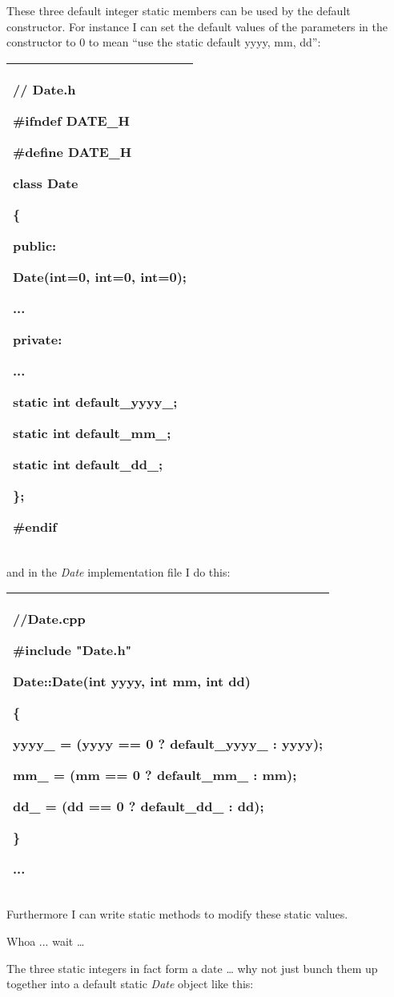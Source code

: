 \documentclass[
]{article}
\begin{document}
These three default integer static members can be used by the default
constructor. For instance I can set the default values of the parameters
in the constructor to 0 to mean ``use the static default yyyy, mm, dd'':

\begin{longtable}[]{@{}l@{}}
\toprule
\endhead
\begin{minipage}[t]{0.97\columnwidth}\raggedright
// Date.h

\#ifndef DATE\_H

\#define DATE\_H

class Date

\{

public:

Date(int=\textbf{0}, int=\textbf{0}, int=\textbf{0});

...

private:

...

static int default\_yyyy\_;

static int default\_mm\_;

static int default\_dd\_;

\};

\#endif\strut
\end{minipage}\tabularnewline
\bottomrule
\end{longtable}

and in the \emph{Date} implementation file I do this:

\begin{longtable}[]{@{}l@{}}
\toprule
\endhead
\begin{minipage}[t]{0.97\columnwidth}\raggedright
//Date.cpp

\#include "Date.h"

Date::Date(int yyyy, int mm, int dd)

\{

yyyy\_ = (yyyy == 0 ? default\_yyyy\_ : yyyy);

mm\_ = (mm == 0 ? default\_mm\_ : mm);

dd\_ = (dd == 0 ? default\_dd\_ : dd);

\}

...\strut
\end{minipage}\tabularnewline
\bottomrule
\end{longtable}

Furthermore I can write static methods to modify these static values.

Whoa ... wait \ldots{}

The three static integers in fact form a date \ldots{} why not just
bunch them up together into a default static \emph{Date} object like
this:
\end{document}
